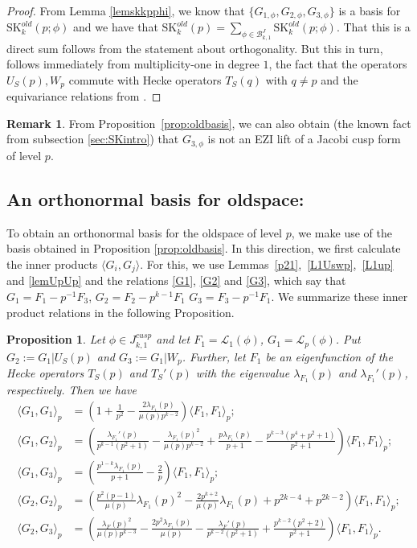 \documentclass[11pt]{amsart}
\numberwithin{equation}{section}
\theoremstyle{plain}
\newtheorem{prop}[thm]{Proposition}
\theoremstyle{definition}
\newtheorem{rmk}[thm]{Remark}
\newcommand{\propref}[1]{Proposition~\ref{#1}}
\newcommand{\mc}{\mathcal}
\newcommand{\mrm}{\mathrm}
\newcommand{\lan}{\langle }
\newcommand{\ran}{\rangle}
\newcommand{\skk}{\mrm{SK}_k}
\begin{document}
\begin{proof}
From Lemma \ref{lemskkpphi}, we know that $\{G_{1,\phi}, G_{2,\phi}, G_{3,\phi}\}$ is a basis for $\skk^{old}(p; \phi)$ and we have that $\skk^{old}(p)=\sum_{\phi\in  \mc B^J_{k,1}}\skk^{old}(p; \phi)$. That this is a direct sum follows from the statement about orthogonality. But this in turn, follows immediately from multiplicity-one in degree $1$, the fact that the operators $U_S(p), W_p$ commute with Hecke operators $T_S(q)$ with $q \ne p$ and the equivariance relations from \cite[Theorem 4.1]{Ibu-SK}.
\end{proof}
\begin{rmk}
    From \propref{prop:oldbasis}, we can also obtain (the known fact from subsection \ref{sec:SKintro}) that 
    $G_{3,\phi}$ is not an EZI lift of a Jacobi cusp form of level $p$.
\end{rmk}

\subsection{An orthonormal basis for oldspace:} To obtain an orthonormal basis for the oldspace of level $p$, we make use of the basis obtained in Proposition \ref{prop:oldbasis}. In this direction, we first calculate the inner products $\lan G_i, G_j\ran$.
For this, we use Lemmas~\ref{p21},~\ref{L1Uswp},~\ref{L1up} and \ref{lemUpUp} and the relations \eqref{G1}, \eqref{G2} and \eqref{G3}, which say that $G_1= F_1-p^{-1} F_3$, $G_2=F_2 - p^{k-1} F_1 $ $G_3= F_3 - p^{-1} F_1$. 
We summarize these inner product relations in the following Proposition.
%
\begin{prop}\label{lem:LpIP}
    Let $\phi\in J_{k,1}^{cusp}$ and let $F_1=\mc L_1(\phi)$, $G_1=\mc L_p(\phi)$. Put $G_{2}:= G_{1}|U_S(p)$ and $G_{3}:= G_{1}|W_p$. Further, let $F_1$ be an eigenfunction of the Hecke operators $T_S(p)$ and $T_S'(p)$  with the eigenvalue $\lambda_{F_1}(p)$ and $\lambda_{F_1}'(p)$, respectively. Then we have
    \begin{align}
    \lan G_1, G_1\ran_p &= \left(1+\frac{1}{p^2}-\frac{2\lambda_{F_1}(p)}{\mu(p)p^{k-2}}\right)\lan F_1, F_1\ran_p; \label{G1G1norm}\\
    \lan G_1, G_2\ran_p&=\left(\frac{\lambda_{F_1}'(p)}{p^{k-1}(p^2+1)}-\frac{\lambda_{F_1}(p)^2}{\mu(p)p^{k-2}}+\frac{p\lambda_{F_1}(p)}{p+1}-\frac{p^{k-3}(p^4+p^2+1)}{p^2+1}\right)\lan F_1, F_1\ran_p; \label{G1G2norm} \\
    \lan G_1, G_3\ran_p &= \left(\frac{p^{1-k}\lambda_{F_1}(p)}{p+1}-\frac{2}{p}\right) \lan F_1, F_1\ran_p;\\
    \lan G_2, G_2 \ran_p &= \left(\frac{p^2(p-1)}{\mu(p)}\lambda_{F_1}(p)^2-\frac{2p^{k+2}}{\mu(p)}\lambda_{F_1}(p)+p^{2k-4}+p^{2k-2}\right) \lan F_1, F_1\ran_p;\label{G2G2norm}\\
    \lan G_2, G_3\ran_p&= \left(\frac{\lambda_F(p)^2}{\mu(p)p^{k-3}}- \frac{2p^2\lambda_{F_1}(p)}{\mu(p)}-\frac{\lambda_F'(p)}{p^{k-2}(p^2+1)}+\frac{p^{k-2}(p^2+2)}{p^2+1}\right)\lan F_1, F_1 \ran_p.
    \end{align}
\end{prop}
\end{document}

